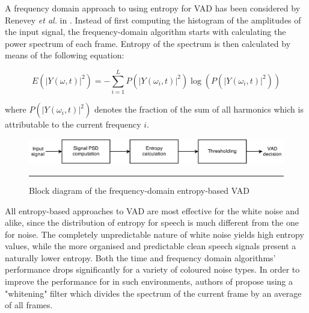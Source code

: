 A frequency domain approach to using entropy for VAD has been considered by Renevey \emph{et al.} in \cite{Renevey}. Instead of first computing the histogram of the amplitudes of the input signal, the frequency-domain algorithm starts with calculating the power spectrum of each frame. Entropy of the spectrum is then calculated by means of the following equation:

\begin{equation}
E( \left |  Y \left ( \omega, t \right ) \right |^{2} ) = - \sum_{i=1}^{L} P( \left |  Y \left ( \omega_i, t \right ) \right |^{2} ) \log \left( P( \left |  Y \left ( \omega_i, t \right ) \right |^{2} ) \right)
\end{equation}

where $P( \left |  Y \left ( \omega_i, t \right ) \right |^{2} )$ denotes the fraction of the sum of all harmonics which is attributable to the current frequency $i$.

\begin{figure}[htbp]
	\centering
		\includegraphics[width=0.9\columnwidth]{Figures/Renevey.png}
		\rule{37em}{0.5pt}
	\caption[Block diagram of the frequency-domain entropy-based VAD]{Block diagram of the frequency-domain entropy-based VAD \cite{Renevey}}
	\label{fig:Renevey}
\end{figure}

All entropy-based approaches to VAD are most effective for the white noise and alike, since the distribution of entropy for speech is much different from the one for noise. The completely unpredictable nature of white noise yields high entropy values, while the more organised and predictable clean speech signals present a naturally lower entropy. Both the time and frequency domain algorithms' performance drops significantly for a variety of coloured noise types. In order to improve the performance for in such environments, authors of \cite{Renevey} propose using a "whitening" filter which divides the spectrum of the current frame by an average of all frames.